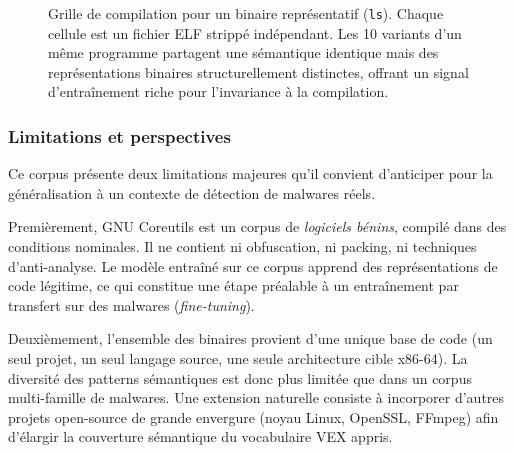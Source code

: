 \begin{figure}[ht]
\begin{tikzpicture}
\end{tikzpicture}
\caption{Grille de compilation pour un binaire représentatif
  (\texttt{ls}). Chaque cellule est un fichier ELF strippé
  indépendant. Les 10 variants d'un même programme partagent
  une sémantique identique mais des représentations binaires
  structurellement distinctes, offrant un signal d'entraînement
  riche pour l'invariance à la compilation.}
\label{fig:dataset_variants}
\end{figure}

\subsubsection{Limitations et perspectives}

Ce corpus présente deux limitations majeures qu'il convient d'anticiper
pour la généralisation à un contexte de détection de malwares réels.

Premièrement, GNU Coreutils est un corpus de \emph{logiciels
bénins}, compilé dans des conditions nominales. Il ne contient ni
obfuscation, ni packing, ni techniques d'anti-analyse. Le modèle
entraîné sur ce corpus apprend des représentations de code
légitime, ce qui constitue une étape préalable à un entraînement
par transfert sur des malwares (\emph{fine-tuning}).

Deuxièmement, l'ensemble des binaires provient d'une unique base
de code (un seul projet, un seul langage source, une seule
architecture cible x86-64). La diversité des patterns sémantiques
est donc plus limitée que dans un corpus multi-famille de malwares.
Une extension naturelle consiste à incorporer d'autres projets
open-source de grande envergure (noyau Linux, OpenSSL, FFmpeg)
afin d'élargir la couverture sémantique du vocabulaire VEX appris.
